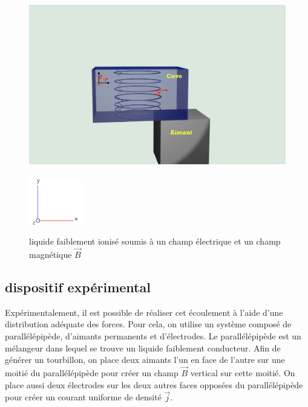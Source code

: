 \documentclass[a4paper,12pt,titlepage]{report}
\begin{document}
\begin{onehalfspace}
\begin{figure}
\begin{center}
		\includegraphics[height = 8cm, keepaspectratio]{graphes/blender_cuve_champvec2.png}
		\includegraphics[height = 2cm, keepaspectratio]{graphes/axes.png}
		\caption{liquide faiblement ionisé soumis à un champ électrique et un champ magnétique $\vec{B}$}
	\end{center}
\end{figure}
\subsection{dispositif expérimental} 



Expérimentalement, il est possible de réaliser cet écoulement à l’aide d’une distribution adéquate des forces. Pour cela, on utilise un système composé de parallélépipède, d’aimants permanents et d’électrodes. Le parallélépipède est un mélangeur dans lequel se trouve un liquide faiblement conducteur.
Afin de générer un tourbillon, on place deux aimants l’un en face de l’autre sur une moitié du parallélépipède pour créer un champ $\vec{B}$ vertical sur cette moitié. On place aussi deux électrodes sur les deux autres faces opposées du parallélépipède pour créer un courant uniforme de densité $\vec{j}$.
 

\end{onehalfspace}
\end{document}
